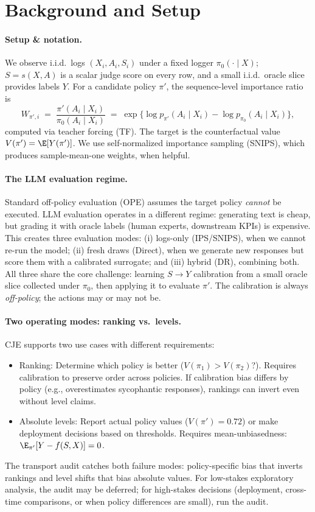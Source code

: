 \section{Background and Setup}
\label{sec:background}

\paragraph{Setup \& notation.}
We observe i.i.d.\ logs $(X_i,A_i,S_i)$ under a fixed logger $\pi_{0}(\cdot\mid X)$; $S=s(X,A)$ is a
scalar judge score on every row, and a small i.i.d.\ oracle slice provides labels $Y$. For a candidate
policy $\pi'$, the sequence-level importance ratio is
\[
W_{\pi',i} \;=\; \frac{\pi'(A_i\mid X_i)}{\pi_{0}(A_i\mid X_i)}
\;=\; \exp\!\big\{\log p_{\pi'}(A_i\mid X_i)-\log p_{\pi_{0}}(A_i\mid X_i)\big\},
\]
computed via teacher forcing (TF). The target is the counterfactual value $V(\pi')=\E[Y(\pi')]$.
We use self-normalized importance sampling (SNIPS), which produces sample-mean-one weights, when helpful.

\paragraph{The LLM evaluation regime.}
Standard off-policy evaluation (OPE) assumes the target policy \emph{cannot} be executed. LLM evaluation operates in a different regime: generating text is cheap, but grading it with oracle labels (human experts, downstream KPIs) is expensive. This creates three evaluation modes: (i) logs-only (IPS/SNIPS), when we cannot re-run the model; (ii) fresh draws (Direct), when we generate new responses but score them with a calibrated surrogate; and (iii) hybrid (DR), combining both. All three share the core challenge: learning $S \to Y$ calibration from a small oracle slice collected under $\pi_0$, then applying it to evaluate $\pi'$. The calibration is always \emph{off-policy}; the actions may or may not be.

\paragraph{Two operating modes: ranking vs.\ levels.}
CJE supports two use cases with different requirements:
\begin{itemize}[leftmargin=*,nosep]
\item Ranking: Determine which policy is better ($V(\pi_1) > V(\pi_2)$?). Requires calibration to preserve order across policies. If calibration bias differs by policy (e.g., overestimates sycophantic responses), rankings can invert even without level claims.
\item Absolute levels: Report actual policy values ($V(\pi') = 0.72$) or make deployment decisions based on thresholds. Requires mean-unbiasedness: $\E_{\pi'}[Y - f(S,X)] = 0$.
\end{itemize}
\noindent The transport audit catches both failure modes: policy-specific bias that inverts rankings and level shifts that bias absolute values. For low-stakes exploratory analysis, the audit may be deferred; for high-stakes decisions (deployment, cross-time comparisons, or when policy differences are small), run the audit.

